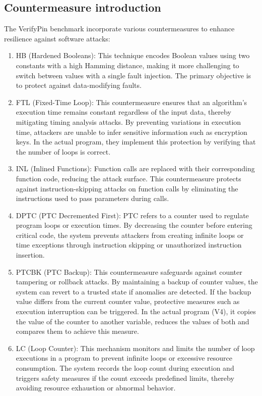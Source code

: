 \subsection{Countermeasure introduction}
The VerifyPin benchmark incorporate various countermeasures to enhance resilience against software attacks:

\begin{enumerate}
\item HB (Hardened Booleans): This technique encodes Boolean values using two constants with a high Hamming distance, making it more challenging to switch between values with a single fault injection. The primary objective is to protect against data-modifying faults.

\item FTL (Fixed-Time Loop): This countermeasure ensures that an algorithm's execution time remains constant regardless of the input data, thereby mitigating timing analysis attacks. By preventing variations in execution time, attackers are unable to infer sensitive information such as encryption keys. In the actual program, they implement this protection by verifying that the number of loops is correct.

\item INL (Inlined Functions): Function calls are replaced with their corresponding function code, reducing the attack surface. This countermeasure protects against instruction-skipping attacks on function calls by eliminating the instructions used to pass parameters during calls.

\item DPTC (PTC Decremented First): PTC refers to a counter used to regulate program loops or execution times. By decreasing the counter before entering critical code, the system prevents attackers from creating infinite loops or time exceptions through instruction skipping or unauthorized instruction insertion.

\item PTCBK (PTC Backup): This countermeasure safeguards against counter tampering or rollback attacks. By maintaining a backup of counter values, the system can revert to a trusted state if anomalies are detected. If the backup value differs from the current counter value, protective measures such as execution interruption can be triggered. In the actual program (V4), it copies the value of the counter to another variable, reduces the values of both and compares them to achieve this measure.

\item LC (Loop Counter): This mechanism monitors and limits the number of loop executions in a program to prevent infinite loops or excessive resource consumption. The system records the loop count during execution and triggers safety measures if the count exceeds predefined limits, thereby avoiding resource exhaustion or abnormal behavior.


\end{enumerate}
